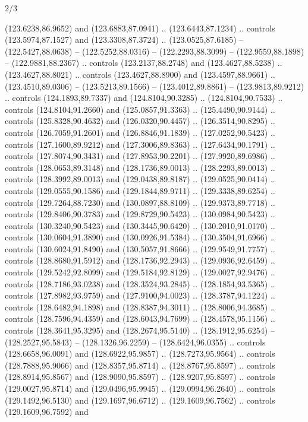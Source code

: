 \begin{flagdescription}{2/3}
\begin{scope}[xshift=0.5\flaglength,yshift=0.5\flagwidth,scale=\flagwidth/180]
\begin{scope}[y=0.8pt, x=0.8pt, yscale=-1,shift={(-168.75,-108.75)}]
  (123.6238,86.9652) and (123.6883,87.0941) .. (123.6443,87.1234) .. controls
  (123.5974,87.1527) and (123.3308,87.3724) .. (123.0525,87.6185) --
  (122.5427,88.0638) -- (122.5252,88.0316) -- (122.2293,88.3099) --
  (122.9559,88.1898) -- (122.9881,88.2367) .. controls (123.2137,88.2748) and
  (123.4627,88.5238) .. (123.4627,88.8021) .. controls (123.4627,88.8900) and
  (123.4597,88.9661) .. (123.4510,89.0306) -- (123.5213,89.1566) --
  (123.4012,89.8861) -- (123.9813,89.9212) .. controls (124.1893,89.7337) and
  (124.8104,90.3285) .. (124.8104,90.7533) .. controls (124.8104,91.2660) and
  (125.0857,91.3363) .. (125.4490,90.9144) .. controls (125.8328,90.4632) and
  (126.0320,90.4457) .. (126.3514,90.8295) .. controls (126.7059,91.2601) and
  (126.8846,91.1839) .. (127.0252,90.5423) .. controls (127.1600,89.9212) and
  (127.3006,89.8363) .. (127.6434,90.1791) .. controls (127.8074,90.3431) and
  (127.8953,90.2201) .. (127.9920,89.6986) .. controls (128.0653,89.3148) and
  (128.1736,89.0013) .. (128.2293,89.0013) .. controls (128.3992,89.0013) and
  (129.0438,89.8187) .. (129.0525,90.0414) .. controls (129.0555,90.1586) and
  (129.1844,89.9711) .. (129.3338,89.6254) .. controls (129.7264,88.7230) and
  (130.0897,88.8109) .. (129.9373,89.7718) .. controls (129.8406,90.3783) and
  (129.8729,90.5423) .. (130.0984,90.5423) .. controls (130.3240,90.5423) and
  (130.3445,90.6420) .. (130.2010,91.0170) .. controls (130.0604,91.3890) and
  (130.0926,91.5384) .. (130.3504,91.6966) .. controls (130.6024,91.8490) and
  (130.5057,91.8666) .. (129.9549,91.7757) .. controls (128.8680,91.5912) and
  (128.1736,92.2943) .. (129.0936,92.6459) .. controls (129.5242,92.8099) and
  (129.5184,92.8129) .. (129.0027,92.9476) .. controls (128.7186,93.0238) and
  (128.3524,93.2845) .. (128.1854,93.5365) .. controls (127.8982,93.9759) and
  (127.9100,94.0023) .. (128.3787,94.1224) .. controls (128.6482,94.1898) and
  (128.8387,94.3011) .. (128.8006,94.3685) .. controls (128.7596,94.4359) and
  (128.6043,94.7699) .. (128.4578,95.1156) .. controls (128.3641,95.3295) and
  (128.2674,95.5140) .. (128.1912,95.6254) -- (128.2527,95.5843) --
  (128.1326,96.2259) -- (128.6424,96.0355) .. controls (128.6658,96.0091) and
  (128.6922,95.9857) .. (128.7273,95.9564) .. controls (128.7888,95.9066) and
  (128.8357,95.8714) .. (128.8767,95.8597) .. controls (128.8914,95.8567) and
  (128.9090,95.8597) .. (128.9207,95.8597) .. controls (129.0027,95.8714) and
  (129.0496,95.9945) .. (129.0994,96.2640) .. controls (129.1492,96.5130) and
  (129.1697,96.6712) .. (129.1609,96.7562) .. controls (129.1609,96.7592) and

\end{scope}
\end{scope}
\end{flagdescription}
